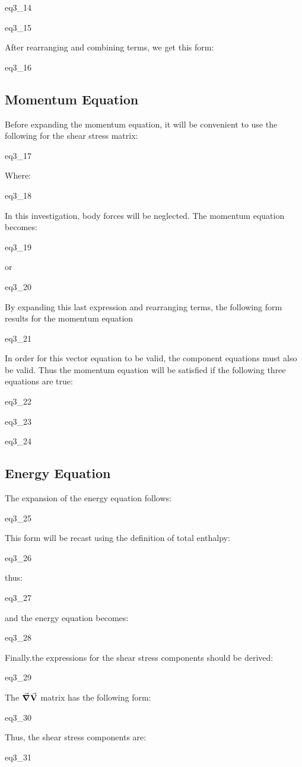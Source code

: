 {eq3_14}

{eq3_15}

After rearranging and combining terms, we get this form:

{eq3_16}

\subsection{Momentum Equation}

Before expanding the momentum equation, it will be convenient to use the
following for the shear stress matrix:

{eq3_17}

Where:

{eq3_18}

In this investigation, body forces will be neglected. The momentum equation
becomes:

{eq3_19}

or

{eq3_20}

By expanding this last expression and rearranging terms, the following form
results for the momentum equation

{eq3_21}

In order for this vector equation to be valid, the component equations must also be valid. Thus the momentum equation will be satisfied if the following three equations are true:

{eq3_22}

{eq3_23}

{eq3_24}

\subsection{Energy Equation}

The expansion of the energy equation follows:

{eq3_25}

This form will be recast using the definition of total enthalpy:

{eq3_26}

thus:

{eq3_27}

and the energy equation becomes:

{eq3_28}

Finally.the expressions for the shear stress components should be derived:

{eq3_29}

The $\grad\va{V}$ matrix has the following form:

{eq3_30}

Thus, the shear stress components are:

{eq3_31}



